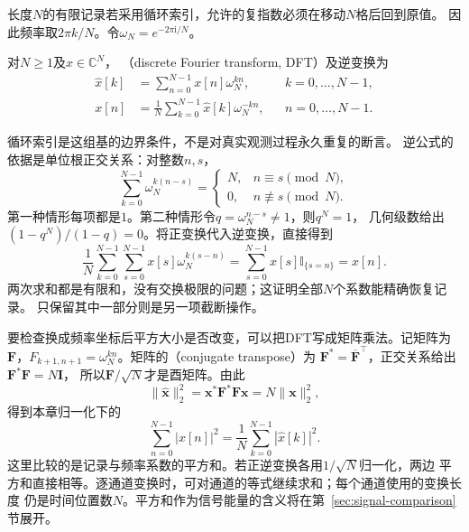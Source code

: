长度$N$的有限记录若采用循环索引，允许的复指数必须在移动$N$格后回到原值。
因此频率取$2\pi k/N$。令$\omega_N=e^{-2\pi\mathrm i/N}$。
\begin{definition}[离散傅里叶变换]
  \label{def:signal-analysis-dft}
  对$N\geq1$及$x\in\mathbb C^N$，
  （discrete Fourier transform, DFT）及逆变换为
  \begin{align}
    \widehat x[k]&=\sum_{n=0}^{N-1}x[n]\omega_N^{kn},
    &&k=0,\ldots,N-1,
    \label{eq:signal-analysis-dft}\\
    x[n]&=\frac1N\sum_{k=0}^{N-1}\widehat x[k]\omega_N^{-kn},
    &&n=0,\ldots,N-1.
    \label{eq:signal-analysis-idft}
  \end{align}
\BookEquationAliases{\label{eq:cnn-dft-inverse}}
\end{definition}
循环索引是这组基的边界条件，不是对真实观测过程永久重复的断言。
逆公式的依据是单位根正交关系：对整数$n,s$，
\begin{equation}
  \sum_{k=0}^{N-1}\omega_N^{k(n-s)}
  =
  \begin{cases}
    N,&n\equiv s\pmod N,\\
    0,&n\not\equiv s\pmod N.
  \end{cases}
  \label{eq:signal-analysis-root-orthogonality}
\end{equation}
第一种情形每项都是$1$。第二种情形令$q=\omega_N^{n-s}\neq1$，则$q^N=1$，
几何级数给出$(1-q^N)/(1-q)=0$。将正变换代入逆变换，直接得到
\[
  \frac1N\sum_{k=0}^{N-1}\sum_{s=0}^{N-1}x[s]\omega_N^{k(s-n)}
  =\sum_{s=0}^{N-1}x[s]\mathbb I_{\{s=n\}}=x[n].
\]
两次求和都是有限和，没有交换极限的问题；这证明全部$N$个系数能精确恢复记录。
只保留其中一部分则是另一项截断操作。

要检查换成频率坐标后平方大小是否改变，可以把DFT写成矩阵乘法。记矩阵为
$\bm F$，$F_{k+1,n+1}=\omega_N^{kn}$。矩阵的（conjugate transpose）为
$\bm F^*=\overline{\bm F}^{\top}$，正交关系给出$\bm F^*\bm F=N\bm I$，
所以$\bm F/\sqrt N$才是酉矩阵。由此
\[
  \|\widehat{\bm x}\|_2^2
  =\bm x^*\bm F^*\bm F\bm x=N\|\bm x\|_2^2,
\]
得到本章归一化下的
\begin{equation}
  \sum_{n=0}^{N-1}|x[n]|^2
  =\frac1N\sum_{k=0}^{N-1}|\widehat x[k]|^2.
  \label{eq:signal-analysis-parseval}
\end{equation}
这里比较的是记录与频率系数的平方和。若正逆变换各用$1/\sqrt N$归一化，两边
平方和直接相等。逐通道变换时，可对通道的等式继续求和；每个通道使用的变换长度
仍是时间位置数$N$。平方和作为信号能量的含义将在第~\ref{sec:signal-comparison}节展开。


